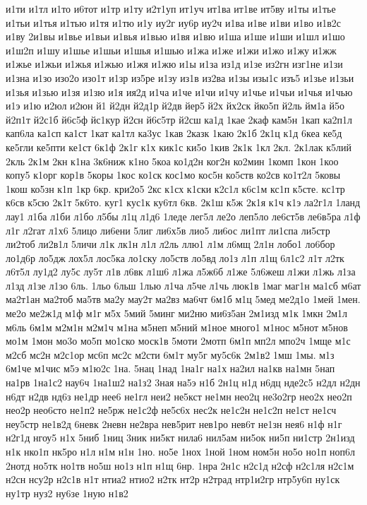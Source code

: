 {и1ти
и1тл
и1то
и6тот
и1тр
и1ту
и2т1уп
ит1уч
ит1ва
ит1ве
ит5ву
и1ты
и1тье
и1тьи
и1тья
и1тью
и1тя
и1тю
и1у
иу2г
иу6р
иу2ч
и1ва
и1ве
и1ви
и1во
и1в2с
и1ву
2и1вы
и1вье
и1вьи
и1вья
и1вью
и1вя
и1вю
и1ша
и1ше
и1ши
и1шл
и1шо
и1ш2п
и1шу
и1шье
и1шьи
и1шья
и1шью
и1жа
и1же
и1жи
и1жо
и1жу
и1жж
и1жье
и1жьи
и1жья
и1жью
и1жя
и1жю
и1ы
и1за
из1д
и1зе
из2гн
изг1не
и1зи
и1зна
и1зо
изо2о
изо1т
и1зр
из5ре
и1зу
из1в
из2ва
и1зы
изы1с
изъ5
и1зье
и1зьи
и1зья
и1зью
и1зя
и1зю
и1я
ия2д
и1ча
и1че
и1чи
и1чу
и1чье
и1чьи
и1чья
и1чью
и1э
и1ю
и2юл
и2юн
й1
й2дн
й2д1р
й2дв
йер5
й2х
йх2ск
йко5п
й2ль
йм1а
й5о
й2п1т
й2с1б
й6с5ф
йс1кур
й2сн
й6с5тр
й2сш
ка1д
1кае
2каф
кам5н
1кап
ка2п1л
кап6ла
ка1сп
ка1ст
1кат
ка1тл
ка3ус
1кав
2казк
1каю
2к1б
2к1ц
к1д
6кеа
ке5д
ке5гли
ке5пти
ке1ст
6к1ф
2к1г
к1х
кик1с
ки5о
1кив
2к1к
1кл
2кл.
2к1лак
к5лий
2кль
2к1м
2кн
к1на
3к6ниж
к1но
5коа
ко1д2н
ког2н
ко2мин
1комп
1кон
1коо
копу5
к1орг
кор1в
5коры
1кос
ко1ск
кос1мо
кос5н
ко5ств
ко2св
ко1т2л
5ковы
1кош
ко5зн
к1п
1кр
6кр.
кри2о5
2кс
к1сх
к1ски
к2с1л
к6с1м
кс1п
к5сте.
кс1тр
к6св
к5сю
2к1т
5к6то.
куг1
кус1к
ку6тл
6кв.
2к1ш
к5ж
2к1я
к1ч
к1э
ла2г1л
1ланд
лау1
л1ба
л1би
л1бо
л5бы
л1ц
л1д6
1леде
лег5л
ле2о
леп5ло
ле6ст5в
ле6в5ра
л1ф
л1г
л2гат
л1х6
5лицо
ли6ени
5лиг
ли6х5в
лио5
ли6ос
ли1пт
ли1спа
ли5стр
ли2тоб
ли2в1л
5личи
л1к
лк1н
л1л
л2ль
ллю1
л1м
л6мщ
2л1н
лобо1
ло6бор
ло1д6р
ло5дж
лох5л
лос5ка
ло1ску
ло5ств
ло5вд
ло1з
л1п
л1щ
6л1с2
л1т
л2тк
л6т5л
лу1д2
лу5с
лу5т
л1в
л6вк
л1ш6
л1жа
л5ж6б
л1же
5л6жеш
л1жи
л1жь
л1за
л1зд
л1зе
л1зо
6ль.
1льо
6льш
1лью
л1ча
л5че
л1чь
люк1в
1маг
маг1н
ма1сб
м6ат
ма2т1ан
ма2тоб
ма5тв
ма2у
мау2т
ма2вз
ма6чт
6м1б
м1ц
5мед
ме2д1о
1мей
1мен.
ме2о
ме2ж1д
м1ф
м1г
м5х
5мий
5минг
ми2ню
ми6з5ан
2м1изд
м1к
1мкн
2м1л
м6ль
6м1м
м2м1н
м2м1ч
м1на
м5неп
м5ний
м1ное
много1
м1нос
м5нот
м5нов
мо1м
1мон
мо3о
мо5п
мо1ско
моск1в
5моти
2мотп
6м1п
мп2л
мпо2ч
1мще
м1с
м2сб
мс2н
м2с1ор
мс6п
мс2с
м2сти
6м1т
му5г
му5с6к
2м1в2
1мш
1мы.
м1з
6м1че
м1чис
м5э
м1ю2с
1на.
5нац
1над
1на1г
на1х
на2ил
на1кв
на1мн
5нап
на1рв
1на1с2
нау6ч
1на1ш2
на1з2
3ная
на5э
н1б
2н1ц
н1д
н6дц
нде2с5
н2дл
н2дн
н6дт
н2дв
нд6з
не1др
нее6
не1гл
неи2
не5кст
не1мн
нео2ц
не3о2гр
нео2х
нео2п
нео2р
нео6сто
не1п2
не5рж
не1с2ф
не5с6х
нес2к
не1с2н
не1с2п
не1ст
не1сч
неу5стр
не1в2д
6невк
2невн
не2вра
нев5рит
нев1ро
нев6т
не1зн
нея6
н1ф
н1г
н2г1д
нгоу5
н1х
5ниб
1ниц
3ник
ни5кт
нила6
нил5ам
ни5ок
ни5п
ни1стр
2н1изд
н1к
нко1п
нк5ро
н1л
н1м
н1н
1но.
но5е
1нох
1ной
1ном
ном5н
но5о
но1п
ноп6л
2нотд
но5тк
но1тв
но5ш
но1з
н1п
н1щ
6нр.
1нра
2н1с
н2с1д
н2сф
н2с1ля
н2с1м
н2сн
нсу2р
н2с1в
н1т
нтиа2
нтио2
н2тк
нт2р
н2трад
нтр1и2гр
нтр5у6п
ну1ск
ну1тр
нуз2
ну6зе
1ную
н1в2
}
